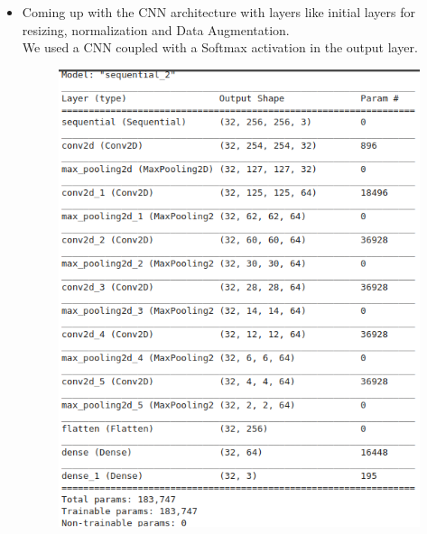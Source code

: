 \documentclass[11pt]{report}
\begin{document}
\begin{itemize}
	\item Coming up with the CNN architecture with layers like initial layers for resizing, normalization and Data Augmentation.\\
	
	We used a CNN coupled with a Softmax activation in the output layer.\\ 
	\begin{figure}[h]
		\centerline{\small 
			\includegraphics[height=0.5\textheight]  {x12}}
	\end{figure}
	
\end{itemize}


\newpage
\end{document}
